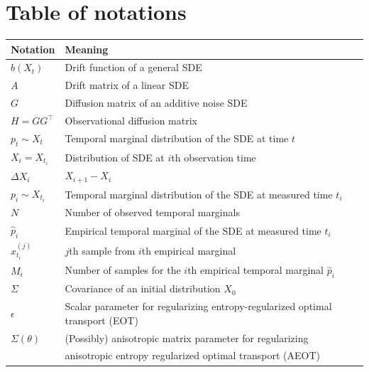 \documentclass[twoside,11pt]{article}
\begin{document}
\section{Table of notations}
\begin{table}[H]
\centering
\begin{tabular}{l|l}
\textbf{Notation} & \textbf{Meaning} \\ \hline
$b(X_t)$ & Drift function of a general SDE \\ 
$A$ & Drift matrix of a linear SDE \\ 
$G$ & Diffusion matrix of an additive noise SDE \\ 
$H = GG^\top $ & Observational diffusion matrix \\ 
$p_t \sim X_{t}$ & Temporal marginal distribution of the SDE at time $t$ \\ 
$X_i = X_{t_i}$ & Distribution of SDE at $i$th observation time \\ 
$\Delta X_i$ & $X_{i+1} - X_i$ \\ 
$p_i \sim X_{t_i}$ & Temporal marginal distribution of the SDE at measured time $t_i$ \\ 
$N$ & Number of observed temporal marginals \\ 
$\hat{p}_i$ & Empirical temporal marginal of the SDE at measured time $t_i$ \\ 
$x_{t_i}^{(j)}$ & $j$th sample from $i$th empirical marginal \\
$M_i$ & Number of samples for the $i$th empirical temporal marginal $\hat{p}_i$ \\ 
$\Sigma$ & Covariance of an initial distribution $X_0$ \\ 
$\epsilon$ & Scalar parameter for regularizing entropy-regularized optimal transport (EOT) \\ 
$\Sigma(\theta)$ & (Possibly) anisotropic matrix parameter for regularizing \\ 
& anisotropic entropy regularized optimal transport (AEOT) \\ 
\end{tabular}
\end{table}



\vskip 0.2in
% 

\end{document}
